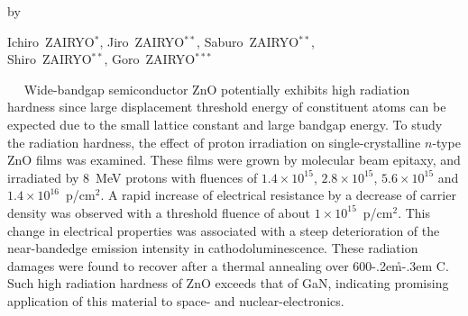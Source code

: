 \documentclass{ujarticle}
\def\degC{\kern-.2em\r{}\kern-.3em C}   %
\begin{document}
\vspace*{-4mm}   %
\begin{center}
{\small by}
\end{center}

\vspace*{-2mm}   %
\begin{center}
 {\fontsize{10.5pt}{0pt}\selectfont  %
Ichiro\ Z{\fontsize{7pt}{0pt}\selectfont AIRYO}$^{\ast}$,
Jiro\ Z{\fontsize{7pt}{0pt}\selectfont AIRYO}$^{\ast\ast}$,
Saburo\ Z{\fontsize{7pt}{0pt}\selectfont AIRYO}$^{\ast\ast}$,
\\
Shiro\ Z{\fontsize{7pt}{0pt}\selectfont AIRYO}$^{\ast\ast}$,
Goro\ Z{\fontsize{7pt}{0pt}\selectfont AIRYO}$^{\ast\ast\ast}$
}
\end{center}


\vspace*{0mm}   %
\begin{center}
\begin{minipage}{160mm}
\baselineskip 12pt%
\setlength{\parindent}{4mm}　%
{\fontsize{9.5pt}{0pt}\selectfont   %
Wide-bandgap semiconductor ZnO potentially exhibits high radiation hardness since large displacement threshold energy of constituent atoms can be expected due to the small lattice constant and large bandgap energy. To study the radiation hardness, the effect of proton irradiation on single-crystalline $n$-type ZnO films was examined. These films were grown by molecular beam epitaxy, and irradiated by $8$~MeV protons with fluences of
$1.4\times 10^{15}$, $2.8\times 10^{15}$, $5.6\times 10^{15}$ and $1.4\times 10^{16}$~p/cm$^2$. A rapid increase of electrical resistance by a decrease of carrier density was observed with a threshold fluence of about $1\times 10^{15}$~p/cm$^2$. This change in electrical properties was associated with a steep deterioration of the near-bandedge emission intensity in cathodoluminescence. These radiation damages were found to recover after a thermal annealing over $600$\degC. Such high radiation hardness of ZnO exceeds that of GaN, indicating promising application of this material to space- and nuclear-electronics.
}
\end{minipage}
\end{center}
\end{document}
